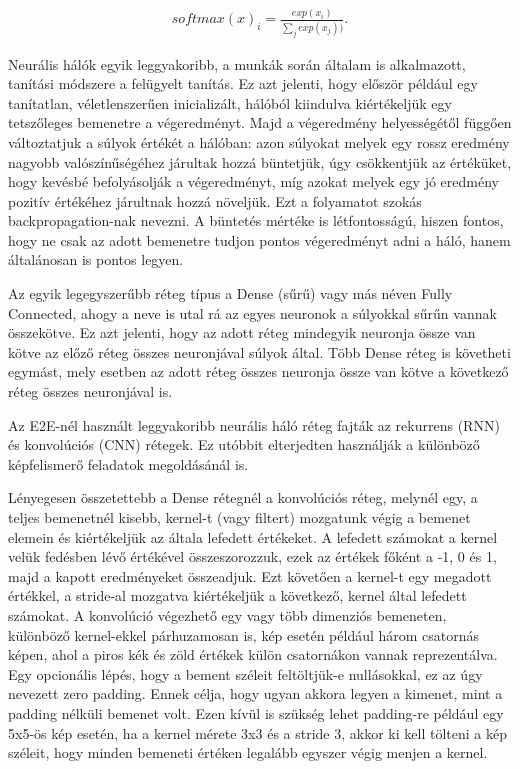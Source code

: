 \begin{align}
softmax(x)_i = \frac{exp(x_i)}{\sum_{j}^{ }exp(x_j))}.
\end{align}

Neurális hálók egyik leggyakoribb, a munkák során általam is alkalmazott, tanítási módszere a felügyelt tanítás. Ez azt jelenti, hogy először például egy tanítatlan, véletlenszerűen inicializált, hálóból kiindulva kiértékeljük egy tetszőleges bemenetre a végeredményt. Majd a végeredmény helyességétől függően változtatjuk a súlyok értékét a hálóban: azon súlyokat melyek egy rossz eredmény nagyobb valószínűségéhez járultak hozzá büntetjük, úgy csökkentjük az értéküket, hogy kevésbé befolyásolják a végeredményt, míg azokat melyek egy jó eredmény pozitív értékéhez járultnak hozzá növeljük. Ezt a folyamatot szokás backpropagation-nak nevezni. A büntetés mértéke is létfontosságú, hiszen fontos, hogy ne csak az adott bemenetre tudjon pontos végeredményt adni a háló, hanem általánosan is pontos legyen. 

Az egyik legegyszerűbb réteg típus a Dense (sűrű) vagy más néven Fully Connected, ahogy a neve is utal rá az egyes neuronok a súlyokkal sűrűn vannak összekötve. Ez azt jelenti, hogy az adott réteg mindegyik neuronja össze van kötve az előző réteg összes neuronjával súlyok által. Több Dense réteg is követheti egymást, mely esetben az adott réteg összes neuronja össze van kötve a következő réteg összes neuronjával is.

Az E2E-nél használt leggyakoribb neurális háló réteg fajták az rekurrens (RNN) és konvolúciós (CNN) rétegek. Ez utóbbit elterjedten használják a különböző képfelismerő feladatok megoldásánál is.

Lényegesen összetettebb a Dense rétegnél a konvolúciós réteg\cite{cnn}, melynél egy, a teljes bemenetnél kisebb, kernel-t (vagy filtert) mozgatunk végig a bemenet elemein és kiértékeljük az általa lefedett értékeket. A lefedett számokat a kernel velük fedésben lévő értékével összeszorozzuk, ezek az értékek főként a -1, 0 és 1, majd a kapott eredményeket összeadjuk. Ezt követően a kernel-t egy megadott értékkel, a stride-al mozgatva kiértékeljük a következő, kernel által lefedett számokat. A konvolúció végezhető egy vagy több dimenziós bemeneten, különböző kernel-ekkel párhuzamosan is, kép esetén például három csatornás képen, ahol a piros kék és zöld értékek külön csatornákon vannak reprezentálva. Egy opcionális lépés, hogy a bement széleit feltöltjük-e nullásokkal, ez az úgy nevezett zero padding. Ennek célja, hogy ugyan akkora legyen a kimenet, mint a padding nélküli bemenet volt. Ezen kívül is szükség lehet padding-re például egy 5x5-ös kép esetén, ha a kernel mérete 3x3 és a stride 3, akkor ki kell tölteni a kép széleit, hogy minden bemeneti értéken legalább egyszer végig menjen a kernel.

